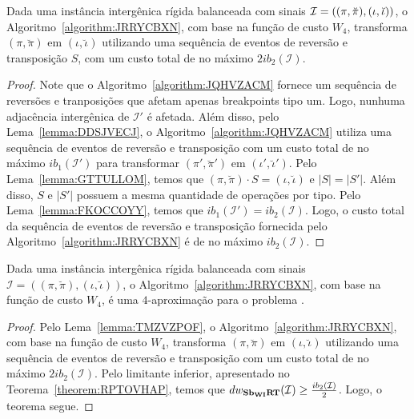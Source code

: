 \begin{lemma}\label{lemma:TMZVZPOF}
Dada uma instância intergênica rígida balanceada com sinais $\mathcal{I}=((\pi,\breve\pi),\break(\iota,\breve\iota))$, o Algoritmo~\ref{algorithm:JRRYCBXN}, com base na função de custo $W_4$, transforma $(\pi,\breve\pi)$ em $(\iota,\breve\iota)$ utilizando uma sequência de eventos de reversão e transposição $S$, com um custo total de no máximo $2ib_2(\mathcal{I})$.
\end{lemma}
\begin{proof}
Note que o Algoritmo~\ref{algorithm:JQHVZACM} fornece um sequência de reversões e tranposições que afetam apenas breakpoints tipo um. Logo, nunhuma adjacência intergênica de $\mathcal{I'}$ é afetada. Além disso, pelo Lema~\ref{lemma:DDSJVECJ}, o Algoritmo~\ref{algorithm:JQHVZACM} utiliza uma sequência de eventos de reversão e transposição com um custo total de no máximo $ib_1(\mathcal{I'})$ para transformar $(\pi',\breve\pi')$ em $(\iota',\breve\iota')$. Pelo Lema~\ref{lemma:GTTULLOM}, temos que $(\pi,\breve\pi) \cdot S = (\iota,\breve\iota)$ e $|S| = |S'|$. Além disso, $S$ e $|S'|$ possuem a mesma quantidade de operações por tipo. Pelo Lema~\ref{lemma:FKOCCOYY}, temos que $ib_1(\mathcal{I'}) = ib_2(\mathcal{I})$. Logo, o custo total da sequência de eventos de reversão e transposição fornecida pelo Algoritmo~\ref{algorithm:JRRYCBXN} é de no máximo $ib_2(\mathcal{I})$.
\end{proof}

\begin{theorem}\label{theorem:IUDGQWGI}
Dada uma instância intergênica rígida balanceada com sinais $\mathcal{I}=((\pi,\breve\pi),(\iota,\breve\iota))$, o Algoritmo~\ref{algorithm:JRRYCBXN}, com base na função de custo $W_4$, é uma $4$-aproximação para o problema \SbWIRT{}.
\end{theorem}
\begin{proof}
Pelo Lema~\ref{lemma:TMZVZPOF}, o Algoritmo~\ref{algorithm:JRRYCBXN}, com base na função de custo $W_4$, transforma $(\pi,\breve\pi)$ em $(\iota,\breve\iota)$ utilizando uma sequência de eventos de reversão e transposição com um custo total de no máximo $2ib_2(\mathcal{I})$. Pelo limitante inferior, apresentado no Teorema~\ref{theorem:RPTOVHAP}, temos que $dw_{\textbf{Sb\textsubscript{WI}RT}}(\mathcal{I}) \ge \frac{ib_2(\mathcal{I})}{2}$. Logo, o teorema segue.
\end{proof}

